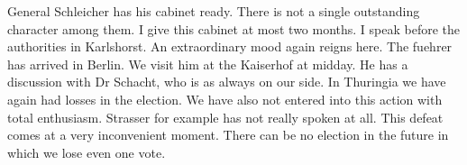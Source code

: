 General Schleicher has his cabinet ready. There is not a single outstanding character among them. I give this cabinet at most two months. I speak before the authorities in Karlshorst. An extraordinary mood again reigns here. The fuehrer has arrived in Berlin. We visit him at the Kaiserhof at midday. He has a discussion with Dr Schacht, who is as always on our side. In Thuringia we have again had losses in the election. We have also not entered into this action with total enthusiasm. Strasser for example has not really spoken at all. This defeat comes at a very inconvenient moment. There can be no election in the future in which we lose even one vote.

